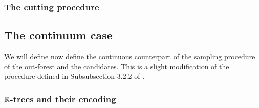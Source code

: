 \subsubsection{The cutting procedure}

\subsection{The continuum case}
We will define now define the continuous counterpart of the sampling procedure of the out-forest and the candidates. This is a slight modification of the procedure defined in Subsubsection 3.2.2 of \cite{Goldschmidt2019}. \\

\subsubsection{\texorpdfstring{${\mathbb R}$}{R}-trees and their encoding}


